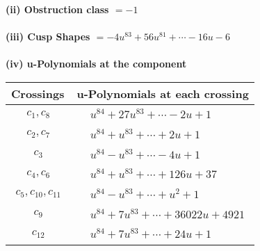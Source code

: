 \documentclass[1p]{elsarticle_modified}
\theoremstyle{definition}
\begin{document}
\flushleft \textbf{(ii) Obstruction class $= -1$}\\~\\
\flushleft \textbf{(iii) Cusp Shapes $= -4 u^{83}+56 u^{81}+\cdots-16 u-6$}\\~\\
\newpage\renewcommand{\arraystretch}{1}
\flushleft \textbf{(iv) u-Polynomials at the component}\newline \\
\begin{tabular}{m{50pt}|m{274pt}}
Crossings & \hspace{64pt}u-Polynomials at each crossing \\
\hline $$\begin{aligned}c_{1},c_{8}\end{aligned}$$&$\begin{aligned}
&u^{84}+27 u^{83}+\cdots-2 u+1
\end{aligned}$\\
\hline $$\begin{aligned}c_{2},c_{7}\end{aligned}$$&$\begin{aligned}
&u^{84}+u^{83}+\cdots+2 u+1
\end{aligned}$\\
\hline $$\begin{aligned}c_{3}\end{aligned}$$&$\begin{aligned}
&u^{84}- u^{83}+\cdots-4 u+1
\end{aligned}$\\
\hline $$\begin{aligned}c_{4},c_{6}\end{aligned}$$&$\begin{aligned}
&u^{84}+u^{83}+\cdots+126 u+37
\end{aligned}$\\
\hline $$\begin{aligned}c_{5},c_{10},c_{11}\end{aligned}$$&$\begin{aligned}
&u^{84}- u^{83}+\cdots+u^2+1
\end{aligned}$\\
\hline $$\begin{aligned}c_{9}\end{aligned}$$&$\begin{aligned}
&u^{84}+7 u^{83}+\cdots+36022 u+4921
\end{aligned}$\\
\hline $$\begin{aligned}c_{12}\end{aligned}$$&$\begin{aligned}
&u^{84}+7 u^{83}+\cdots+24 u+1
\end{aligned}$\\
\hline
\end{tabular}\\~\\
\end{document}

